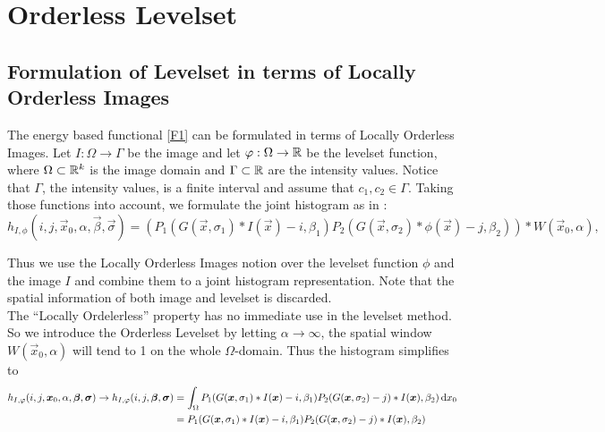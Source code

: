 
\chapter{Orderless Levelset}\label{chapter:OL}
\section{Formulation of Levelset in terms of Locally Orderless Images}\label{section:OLform}
The energy based functional \eqref{F1} can be formulated in terms of Locally Orderless Images. Let $I:\Omega\to \Gamma$ be the image and let $\varphi:\Omega\to\mathbb R$ be the levelset function, where $\Omega\subset \mathbb R^k$ is the image domain and $\Gamma\subset\mathbb R$ are the intensity values. Notice that $\Gamma$, the intensity values, is a finite interval and assume that $c_1,c_2\in \Gamma$. Taking those functions into account, we formulate the joint histogram as in \cite{dar.11}:
\begin{equation}
  h_{I,\phi}(i,j,\vec{x}_0,\alpha,\vec{\beta},\vec{\sigma}) = (P_1(G(\vec{x},\sigma_1)*I(\vec{x})-i,\beta_1)P_2(G(\vec{x},\sigma_2)*\phi(\vec{x})-j,\beta_2))*W(\vec{x}_0,\alpha),
\end{equation}

Thus we use the Locally Orderless Images notion over the levelset function $\phi$ and the image $I$ and combine them to a joint histogram representation. Note that the spatial information of both image and levelset is discarded.\\
The ``Locally Ordelerless'' property has no immediate use in the levelset method. So we introduce the Orderless Levelset by letting $\alpha\to \infty$, the spatial window $W(\vec{x}_0,\alpha)$ will tend to 1 on the whole $\Omega$-domain. Thus the histogram simplifies to
\begin{equation}
  \begin{split}
    h_{I,\varphi}(i,j,\boldsymbol{x} _0,\alpha,\boldsymbol{\beta} ,\boldsymbol{\sigma} )\to h_{I,\varphi}(i,j,\boldsymbol{\beta} ,\boldsymbol{\sigma} ) &= \int _\Omega P_1(G(\boldsymbol{x} ,\sigma_1)*I(\boldsymbol{x} )-i,\beta_1)P_2(G(\boldsymbol{x} ,\sigma_2)-j)*I(\boldsymbol{x} ),\beta_2)\,{\rm d} x_0\\
    &= P_1(G(\boldsymbol{x} ,\sigma_1)*I(\boldsymbol{x} )-i,\beta_1)P_2(G(\boldsymbol{x} ,\sigma_2)-j)*I(\boldsymbol{x} ),\beta_2)
  \end{split}
\end{equation}

